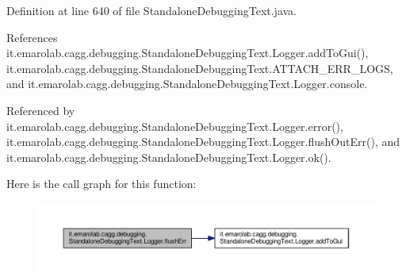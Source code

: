 Definition at line 640 of file Standalone\-Debugging\-Text.\-java.



References it.\-emarolab.\-cagg.\-debugging.\-Standalone\-Debugging\-Text.\-Logger.\-add\-To\-Gui(), it.\-emarolab.\-cagg.\-debugging.\-Standalone\-Debugging\-Text.\-A\-T\-T\-A\-C\-H\-\_\-\-E\-R\-R\-\_\-\-L\-O\-G\-S, and it.\-emarolab.\-cagg.\-debugging.\-Standalone\-Debugging\-Text.\-Logger.\-console.



Referenced by it.\-emarolab.\-cagg.\-debugging.\-Standalone\-Debugging\-Text.\-Logger.\-error(), it.\-emarolab.\-cagg.\-debugging.\-Standalone\-Debugging\-Text.\-Logger.\-flush\-Out\-Err(), and it.\-emarolab.\-cagg.\-debugging.\-Standalone\-Debugging\-Text.\-Logger.\-ok().



Here is the call graph for this function\-:
\nopagebreak
\begin{figure}[H]
\begin{center}
\leavevmode
\includegraphics[width=350pt]{classit_1_1emarolab_1_1cagg_1_1debugging_1_1StandaloneDebuggingText_1_1Logger_aaa508dcaa92c2b63e0e6ac31bc23ddff_cgraph}
\end{center}
\end{figure}


